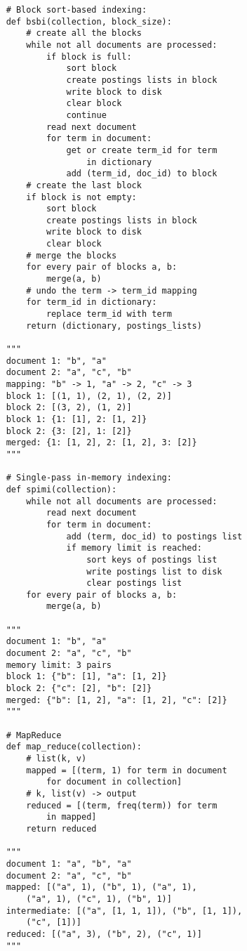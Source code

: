 \begin{lstlisting}
    # Block sort-based indexing:
    def bsbi(collection, block_size):
        # create all the blocks
        while not all documents are processed:
            if block is full:
                sort block
                create postings lists in block
                write block to disk
                clear block
                continue
            read next document
            for term in document:
                get or create term_id for term
                    in dictionary
                add (term_id, doc_id) to block
        # create the last block
        if block is not empty:
            sort block
            create postings lists in block
            write block to disk
            clear block
        # merge the blocks
        for every pair of blocks a, b:
            merge(a, b)
        # undo the term -> term_id mapping
        for term_id in dictionary:
            replace term_id with term
        return (dictionary, postings_lists)

    """
    document 1: "b", "a"
    document 2: "a", "c", "b"
    mapping: "b" -> 1, "a" -> 2, "c" -> 3
    block 1: [(1, 1), (2, 1), (2, 2)]
    block 2: [(3, 2), (1, 2)]
    block 1: {1: [1], 2: [1, 2]}
    block 2: {3: [2], 1: [2]}
    merged: {1: [1, 2], 2: [1, 2], 3: [2]}
    """

    # Single-pass in-memory indexing:
    def spimi(collection):
        while not all documents are processed:
            read next document
            for term in document:
                add (term, doc_id) to postings list
                if memory limit is reached:
                    sort keys of postings list
                    write postings list to disk
                    clear postings list
        for every pair of blocks a, b:
            merge(a, b)

    """
    document 1: "b", "a"
    document 2: "a", "c", "b"
    memory limit: 3 pairs
    block 1: {"b": [1], "a": [1, 2]}
    block 2: {"c": [2], "b": [2]}
    merged: {"b": [1, 2], "a": [1, 2], "c": [2]}
    """

    # MapReduce
    def map_reduce(collection):
        # list(k, v)
        mapped = [(term, 1) for term in document
            for document in collection]
        # k, list(v) -> output
        reduced = [(term, freq(term)) for term
            in mapped]
        return reduced

    """
    document 1: "a", "b", "a"
    document 2: "a", "c", "b"
    mapped: [("a", 1), ("b", 1), ("a", 1),
        ("a", 1), ("c", 1), ("b", 1)]
    intermediate: [("a", [1, 1, 1]), ("b", [1, 1]),
        ("c", [1])]
    reduced: [("a", 3), ("b", 2), ("c", 1)]
    """


\end{lstlisting}
